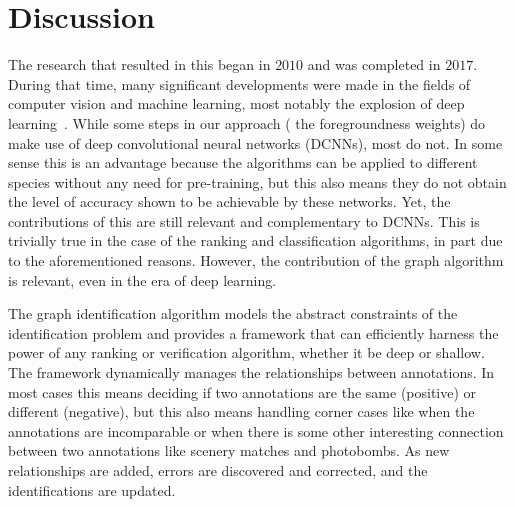     \section{Discussion}\label{sec:discuss}

    The research that resulted in this \thesis{} began in $2010$ and was completed in $2017$.
    During that time, many significant developments were made in the fields of computer vision and machine
      learning, most notably the explosion of deep learning~\cite{lecun_deep_2015}.
    While some steps in our approach (\eg{} the foregroundness weights) do make use of deep convolutional neural
      networks (DCNNs), most do not.
    In some sense this is an advantage because the algorithms can be applied to different species without any
      need for pre-training, but this also means they do not obtain the level of accuracy shown to be achievable by
      these networks.
    Yet, the contributions of this \thesis{} are still relevant and complementary to DCNNs.
    This is trivially true in the case of the ranking and classification algorithms, in part due to the
      aforementioned reasons.
    However, the contribution of the graph algorithm is relevant, even in the era of deep learning.
    
    The graph identification algorithm models the abstract constraints of the identification problem and provides
      a framework that can efficiently harness the power of any ranking or verification algorithm, whether it be
      deep or shallow.
    The framework dynamically manages the relationships between annotations.
    In most cases this means deciding if two annotations are the same (positive) or different (negative), but
      this also means handling corner cases like when the annotations are incomparable or when there is some other
      interesting connection between two annotations like scenery matches and photobombs.
    As new relationships are added, errors are discovered and corrected, and the identifications are updated.

